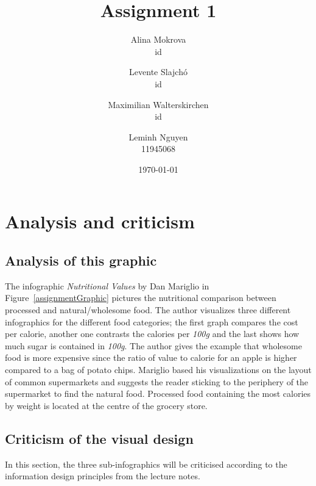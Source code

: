 \documentclass[a4paper]{scrartcl}
\title{Assignment 1}
\author{Alina Mokrova\\
				id
				\and
				Levente	Slajchó\\
				id
				\and
				Maximilian Walterskirchen\\
				id
				\and
				Leminh Nguyen\\
				11945068}
\date{\today}
\begin{document}
\maketitle

\section{Analysis and criticism}


\subsection{Analysis of this graphic}

The infographic \textit{Nutritional Values} by Dan Mariglio in
Figure~\ref{assignmentGraphic} pictures the nutritional comparison between
processed and natural/wholesome food. The author visualizes three different
infographics for the different food categories; the first graph compares the
cost per calorie, another one contrasts the calories per \textit{100g} and the
last shows how much sugar is contained in \textit{100g}. The author gives the
example that wholesome food is more expensive since the ratio of value to
calorie for an apple is higher compared to a bag of potato chips. Mariglio based
his visualizations on the layout of common supermarkets and suggests the reader
sticking to the periphery of the supermarket to find the natural food.
Processed food containing the most calories by weight is located at the centre
of the grocery store.

\subsection{Criticism of the visual design}



In this section, the three sub-infographics will be criticised according to the
information design principles from the lecture notes.
\end{document}
